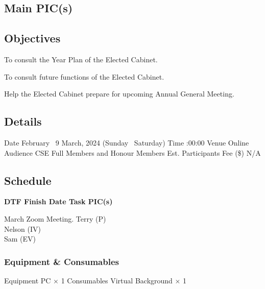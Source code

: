 \startsection[title={CSESS Consultation}][
date={\date[d=25, m=2, y=2024][event]},
pic={Terry (P), Nelson (IV), Sam (EV)}]

\subsection{Main PIC(s)}

\subsection{Objectives}
\startitemize
\item To consult the Year Plan of the Elected Cabinet.
\item To consult future functions of the Elected Cabinet.
\item Help the Elected Cabinet prepare for upcoming Annual General Meeting.
\stopitemize

\subsection{Details}
\starttabulate[|rB|l|]
\NC Date
 February \endash\ 9 March, 2024 (Sunday \endash\ Saturday) \NR
\NC Time
:00:00 \NR
\NC Venue
\NC Online \NR
\NC Audience
\NC CSE Full Members and Honour Members \NR
\NC Est. Participants
 \NR
\NC Fee (\$)
\NC N/A \NR
\stoptabulate

\subsection{Schedule}

\setupTABLE[c][1][width=0.75in]
\setupTABLE[c][2][width=1in]
\setupTABLE[c][3][width=3in]
\setupTABLE[c][4][width=1.25in]
\bTABLE
\bTABLEhead

\bTR\bTH    \bf{DTF}
\eTH\bTH    \bf{Finish Date}
\eTH\bTH    \bf{Task}
\eTH\bTH    \bf{PIC(s)}
\eTH\eTR

\eTABLEhead
\bTABLEbody

\bTR{}
\eTD{} March
\eTD\bTD Zoom Meeting.
\eTD\bTD Terry (P) \\ Nelson (IV) \\ Sam (EV)
\eTD\eTR

\eTABLEbody
\eTABLE

\subsubsection{Equipment \& Consumables}
\starttabulate[|l|l|]
\NC{}Equipment\NC\NR
\HL
\NC PC \NC $\times$ 1 \NR
\HL
\NR
\NC{}Consumables\NC\NR
\HL
\NC Virtual Background \NC $\times$ 1 \NR
\HL
\stoptabulate


